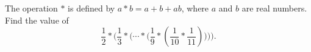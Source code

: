 The operation $*$ is defined by $a*b=a+b+ab$, where $a$ and $b$ are real numbers. Find the value of \[\frac{1}{2}*\bigg(\frac{1}{3}*\Big(\cdots*\big(\frac{1}{9}*(\frac{1}{10}*\frac{1}{11})\big)\Big)\bigg).\]